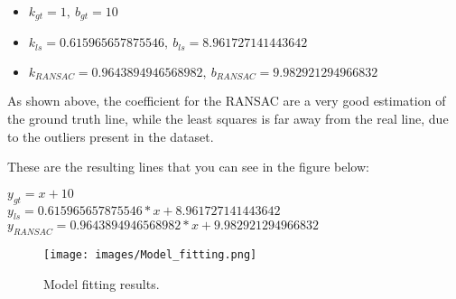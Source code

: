 \documentclass{ETHExercise}
\begin{document}
\begin{itemize}
  \item $k_{gt} = 1,\ b_{gt} = 10$
  \item $k_{ls} = 0.615965657875546, \ b_{ls} = 8.961727141443642$
  \item $k_{RANSAC} = 0.9643894946568982,\ b_{RANSAC} = 9.982921294966832$
\end{itemize}

As shown above, the coefficient for the RANSAC are a very good estimation of the
ground truth line, while the least squares is far away from the real
line, due to the outliers present in the dataset.

These are the resulting lines that you can see in the figure below:
\begin{center}
  $y_{gt} = x + 10$\\
  $y_{ls} = 0.615965657875546 * x + 8.961727141443642 $\\
  $y_{RANSAC} = 0.9643894946568982 * x + 9.982921294966832$
\end{center}

\begin{figure}[!h]
  \texttt{[image: images/Model\_fitting.png]}
  \caption{Model fitting results.}
\end{figure}
\end{document}
